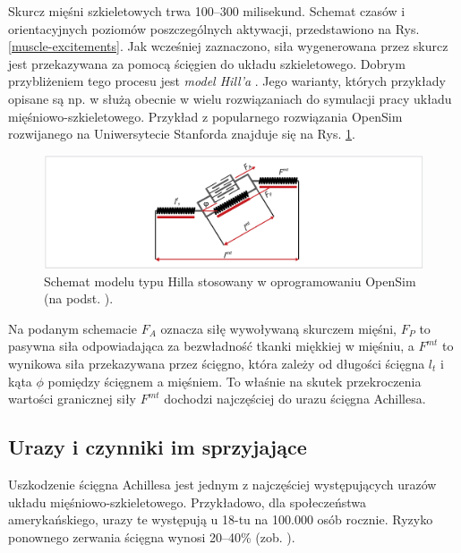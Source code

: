 Skurcz mięśni szkieletowych trwa 100--300 milisekund. Schemat czasów i orientacyjnych poziomów poszczególnych aktywacji, przedstawiono na Rys. \ref{muscle-excitements}. Jak wcześniej zaznaczono, siła wygenerowana przez skurcz jest przekazywana za pomocą ścięgien do układu szkieletowego. Dobrym przybliżeniem tego procesu jest \textit{model Hill'a} \cite{Hill1938}. Jego warianty, których przykłady opisane są np. w \cite{Perreault2003} służą obecnie w wielu rozwiązaniach do symulacji pracy układu mięśniowo-szkieletowego. Przykład z popularnego rozwiązania OpenSim rozwijanego na Uniwersytecie Stanforda znajduje się na Rys. \ref{hill-model}.
\begin{figure}[h!]
	\centering
	\includegraphics[width=1\textwidth]{figures/Hill.png}
	\caption{Schemat modelu typu Hilla stosowany w oprogramowaniu OpenSim (na podst. \cite{Romero2016}).}
	\label{hill-model}
\end{figure}

Na podanym schemacie $F_A$ oznacza siłę wywoływaną skurczem mięśni, $F_P$ \linebreak to pasywna siła odpowiadająca za bezwładność tkanki miękkiej w mięśniu, a $F^{mt}$ to wynikowa siła przekazywana przez ścięgno, która zależy od długości ścięgna $l_t$ \linebreak i kąta $\phi$ pomiędzy ścięgnem a mięśniem. To właśnie na skutek przekroczenia wartości granicznej siły $F^{mt}$ dochodzi najczęściej do urazu ścięgna Achillesa. 

\subsection{Urazy i czynniki im sprzyjające}

Uszkodzenie ścięgna Achillesa jest jednym z najczęściej występujących urazów układu mięśniowo-szkieletowego. Przykładowo, dla społeczeństwa amerykańskiego, urazy te występują u 18-tu na 100.000 osób rocznie. Ryzyko ponownego zerwania ścięgna wynosi 20--40\% (zob. \cite{EpidemiologyUS}). 

